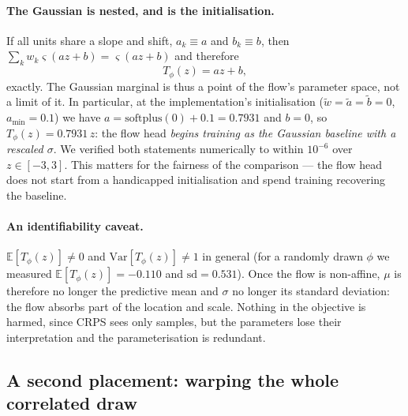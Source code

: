 \documentclass[11pt]{article}
\newcommand{\Exp}{\mathbb{E}}
\begin{document}
\paragraph{The Gaussian is nested, and is the initialisation.} If all units share a
slope and shift, $a_k \equiv a$ and $b_k \equiv b$, then
$\sum_k w_k \varsigma(az+b) = \varsigma(az+b)$ and therefore
\begin{equation}
T_\phi(z) = a z + b ,
\label{eq:nesting}
\end{equation}
exactly. The Gaussian marginal is thus a point of the flow's parameter space, not a
limit of it. In particular, at the implementation's initialisation
($\tilde{w} = \tilde{a} = \tilde{b} = 0$, $a_{\min} = 0.1$) we have
$a = \mathrm{softplus}(0) + 0.1 = 0.7931$ and $b = 0$, so
$T_\phi(z) = 0.7931\,z$: the flow head \emph{begins training as the Gaussian
baseline with a rescaled $\sigma$}. We verified both statements numerically to
within $10^{-6}$ over $z \in [-3,3]$. This matters for the fairness of the
comparison --- the flow head does not start from a handicapped initialisation and
spend training recovering the baseline.

\paragraph{An identifiability caveat.} $\Exp[T_\phi(z)] \ne 0$ and
$\mathrm{Var}[T_\phi(z)] \ne 1$ in general (for a randomly drawn $\phi$ we measured
$\Exp[T_\phi(z)] = -0.110$ and $\mathrm{sd} = 0.531$). Once the flow is non-affine,
$\mu$ is therefore no longer the predictive mean and $\sigma$ no longer its standard
deviation: the flow absorbs part of the location and scale. Nothing in the objective
is harmed, since CRPS sees only samples, but the parameters lose their
interpretation and the parameterisation is redundant.

\subsection{A second placement: warping the whole correlated draw}
\end{document}
